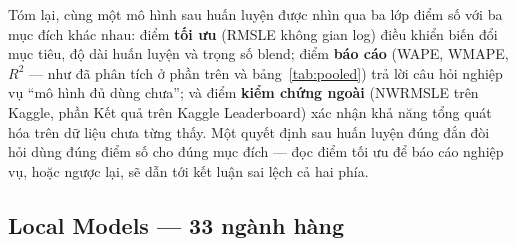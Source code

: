 \documentclass[12pt,a4paper]{report}
\begin{document}
Tóm lại, cùng một mô hình sau huấn luyện được nhìn qua ba lớp điểm số với ba mục đích
khác nhau: điểm \textbf{tối ưu} (RMSLE không gian log) điều khiển biến đổi mục tiêu, độ
dài huấn luyện và trọng số blend; điểm \textbf{báo cáo} (WAPE, WMAPE, $R^2$ --- như đã
phân tích ở phần trên và bảng~\ref{tab:pooled}) trả lời câu hỏi nghiệp vụ ``mô hình đủ
dùng chưa''; và điểm \textbf{kiểm chứng ngoài} (NWRMSLE trên Kaggle, phần Kết quả trên
Kaggle Leaderboard) xác nhận khả năng tổng quát hóa trên dữ liệu chưa từng thấy. Một
quyết định sau huấn luyện đúng đắn đòi hỏi dùng đúng điểm số cho đúng mục đích --- đọc
điểm tối ưu để báo cáo nghiệp vụ, hoặc ngược lại, sẽ dẫn tới kết luận sai lệch cả hai
phía.

\subsection{Local Models --- 33 ngành hàng}
\end{document}
